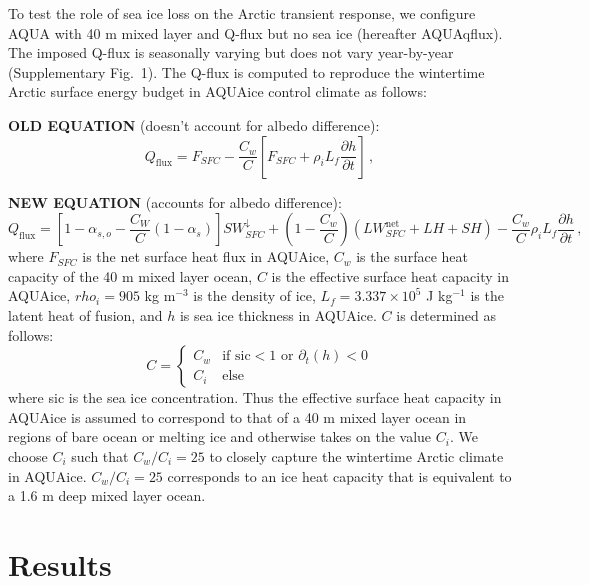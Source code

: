 \documentclass[draft]{agujournal2019}
\begin{document}
To test the role of sea ice loss on the Arctic transient response, we configure AQUA with 40 m mixed layer and Q-flux but no sea ice (hereafter AQUAqflux). The imposed Q-flux is seasonally varying but does not vary year-by-year (Supplementary Fig.~1). The Q-flux is computed to reproduce the wintertime Arctic surface energy budget in AQUAice control climate as follows:

\textbf{OLD EQUATION} (doesn't account for albedo difference):
\begin{equation}
    Q_{\mathrm{flux}} = F_{SFC} - \frac{C_w}{C} \left[ F_{SFC} + \rho_iL_f\frac{\partial h}{\partial t}\right] \, ,
\end{equation}

\textbf{NEW EQUATION} (accounts for albedo difference):
\begin{equation}
    Q_{\mathrm{flux}} = \left[1-\alpha_{s,o}-\frac{C_W}{C}(1-\alpha_s)\right]SW^{\downarrow}_{SFC} + \left(1-\frac{C_w}{C}\right) \left( LW^{\text{net}}_{SFC} + LH + SH \right) - \frac{C_w}{C}\rho_iL_f\frac{\partial h}{\partial t}\, ,
\end{equation}
where $F_{SFC}$ is the net surface heat flux in AQUAice, $C_w$ is the surface heat capacity of the 40 m mixed layer ocean, $C$ is the effective surface heat capacity in AQUAice, $rho_i=905$ kg m$^{-3}$ is the density of ice, $L_f=3.337\times10^{5}$ J kg$^{-1}$ is the latent heat of fusion, and $h$ is sea ice thickness in AQUAice. $C$ is determined as follows:
\[
    C = \left\{\begin{array}{ll}
            C_w & \text{if sic}<1\text{ or }\partial_t(h)<0\\ 
            C_i & \text{else}
    \end{array}\right.
\]
where sic is the sea ice concentration. Thus the effective surface heat capacity in AQUAice is assumed to correspond to that of a 40 m mixed layer ocean in regions of bare ocean or melting ice and otherwise takes on the value $C_i$. We choose $C_i$ such that $C_w/C_i = 25$ to closely capture the wintertime Arctic climate in AQUAice. $C_w/C_i=25$ corresponds to an ice heat capacity that is equivalent to a 1.6 m deep mixed layer ocean.


\section{Results}
\label{sec:res}
\end{document}
